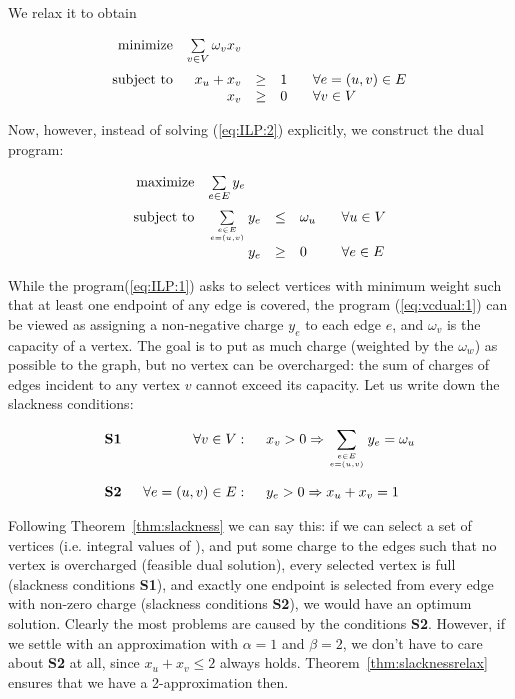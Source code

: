 \noindent
We relax it to obtain

\begin{equation}
\begin{array}{rrcll}
  {\rm minimize}     & \multicolumn{1}{l}{\sum\limits_{v\in V}\omega_vx_v}\\[3ex]
  {\rm subject\ to} & x_u + x_v&\ge&1& \;\;\;\forall e=(u,v)\in E\\
                          & x_v&\ge&0& \;\;\;\forall v\in V\\
\end{array}
\end{equation}

\setcounter{equation}{\tmp}

\noindent
Now, however, instead of solving  (\ref{eq:ILP:2}) explicitly, we construct the dual program:

\begin{equation}
  \label{eq:vcdual:1}
\begin{array}{rrcll}
  {\rm maximize}     & \multicolumn{1}{l}{\sum\limits_{e\in E}y_e}\\[3ex]
  {\rm subject\ to} & \sum\limits_{e\in E\atop e=(u,v)}y_e&\le&\omega_u& \;\;\;\forall u\in V\\[3ex]
                          & y_e&\ge&0& \;\;\;\forall e\in E\\
\end{array}
\end{equation}

\noindent
While the program(\ref{eq:ILP:1}) asks to select vertices with minimum weight such that at least
one endpoint of any edge is covered, the program (\ref{eq:vcdual:1}) can be viewed as assigning 
a non-negative charge $y_e$ to each edge $e$, and $\omega_v$ is the capacity of a vertex.
The goal is to put as much charge (weighted by the $\omega_w$) as possible to the graph, but 
no vertex can be overcharged: the sum of charges of edges incident to any vertex $v$ cannot exceed its capacity.
Let us write down the slackness conditions:


$$\begin{array}{lrl}
  {\bf S1} \;\;&\forall v\in V:\;\;&x_v>0\Rightarrow
  \displaystyle\sum\limits_{e\in E\atop e=(u,v)}y_e=\omega_u\\[6ex]
  {\bf S2} \;\;&\forall e=(u,v)\in E:\;\; & y_e>0\Rightarrow x_u+x_v=1
\end{array}$$

\noindent
Following Theorem~\ref{thm:slackness} we can say this: if we can select a set of vertices (i.e. 
integral values of ), and put some charge to the edges such that no vertex is overcharged 
(feasible dual solution), every selected vertex is full (slackness conditions {\bf S1}),
and exactly one endpoint is selected from every edge with non-zero charge (slackness conditions 
{\bf S2}), we would have an optimum solution.
Clearly the most problems are caused by the conditions {\bf S2}. However, if we settle 
with an approximation with  $\alpha=1$ and $\beta=2$, we don't have to care about  {\bf S2} at all, 
since $x_u+x_v\le2$ always holds. Theorem~\ref{thm:slacknessrelax} ensures that we have a 2-approximation then.

